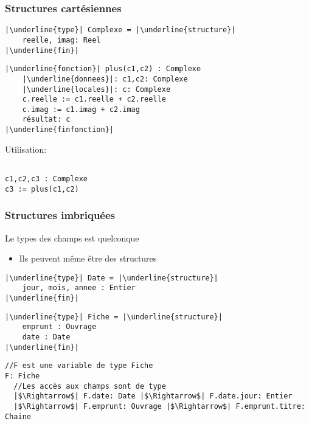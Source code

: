 \documentclass[table,handout,tikz,12pt,svgnames]{beamer}
\begin{document}
\begin{frame}[fragile=singleslide]
	\frametitle{Structures cartésiennes}
	\begin{verbatim}
|\underline{type}| Complexe = |\underline{structure}|
	reelle, imag: Reel
|\underline{fin}|
	\end{verbatim}
	\vspace{-0.9cm} \myline  \vspace{-0.7cm}	
	\begin{verbatim}
|\underline{fonction}| plus(c1,c2) : Complexe
	|\underline{donnees}|: c1,c2: Complexe
	|\underline{locales}|: c: Complexe
	c.reelle := c1.reelle + c2.reelle
	c.imag := c1.imag + c2.imag
	résultat: c
|\underline{finfonction}|
	\end{verbatim}
	\vspace{-0.9cm} \myline  \vspace{-0.5cm}	
Utilisation:	
	\begin{verbatim}

c1,c2,c3 : Complexe
c3 := plus(c1,c2)
	\end{verbatim}
\end{frame}


\begin{frame}[fragile=singleslide]
	\frametitle{Structures imbriquées}
	\begin{itemize}
		\vspace{-0.9cm}
	\end{itemize}
	\vspace{-1.1cm} \myline  \vspace{-1.4cm}
	\begin{block}{}
		\begin{verbatim}
//F est une variable de type Fiche
F: Fiche 
  //Les accès aux champs sont de type
  |$\Rightarrow$| F.date: Date |$\Rightarrow$| F.date.jour: Entier
  |$\Rightarrow$| F.emprunt: Ouvrage |$\Rightarrow$| F.emprunt.titre: Chaine
		\end{verbatim}
	\end{block}		
\end{frame}
\end{document}
